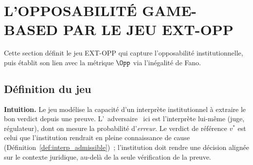 \section{L'OPPOSABILIT\'E GAME-BASED PAR LE JEU EXT-OPP}
\label{sec:gamebased_opposabilite}
\begin{sloppypar}

Cette section d\'efinit le jeu EXT-OPP qui capture l'opposabilit\'e institutionnelle,
puis \'etablit son lien avec la m\'etrique $\Opp$ via l'in\'egalit\'e de Fano.

\subsection{D\'efinition du jeu}

\noindent\textbf{Intuition.} Le jeu mod\'elise la capacit\'e d'un interpr\`ete
institutionnel \`a extraire le bon verdict depuis une preuve. L'\guillemotleft~adversaire~\guillemotright
ici est l'interpr\`ete lui-m\^eme (juge, r\'egulateur), dont on mesure la probabilit\'e
d'\emph{erreur}. Le verdict de r\'ef\'erence $v^*$ est celui que l'institution rendrait en
pleine connaissance de cause (D\'efinition~\ref{def:interp_admissible})~;
l'institution doit rendre une d\'ecision align\'ee sur le contexte juridique, au-del\`a
de la seule v\'erification de la preuve.


\end{sloppypar}
